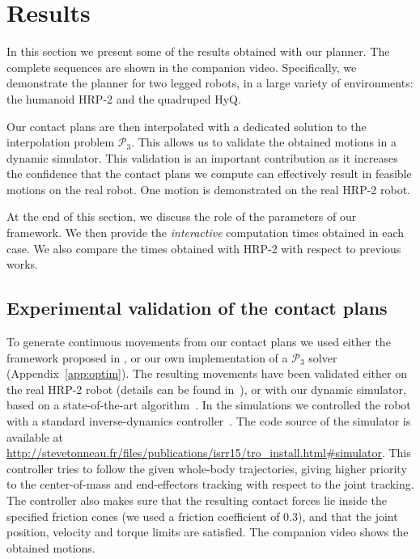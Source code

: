 \section{Results}
\label{sec:results}
In this section we present some of the results obtained with our planner. The complete sequences are shown in the companion video.
Specifically, we demonstrate the planner for two legged robots, in a large variety of environments: the humanoid HRP-2 and the quadruped HyQ.

Our contact plans are then interpolated with a dedicated solution to the interpolation problem $\mathcal{P}_3$. This allows us to validate the obtained
motions in a dynamic simulator. This validation is an important contribution as it increases the confidence that the contact plans we compute can effectively
result in feasible motions on the real robot. One motion is demonstrated on the real HRP-2 robot.

At the end of this section, we discuss the role of the parameters of our framework. We then provide the \textit{interactive} computation times obtained in each case.
We also compare the times obtained with HRP-2 with respect to previous works.

\subsection{Experimental validation of the contact plans} \label{sec:valid}
To generate continuous movements from our contact plans we used either the framework proposed in \cite{Carpentier2016}, or our own implementation of a $\mathcal{P}_3$ solver (Appendix~\ref{app:optim}).
The resulting movements have been validated either on the real HRP-2 robot (details can be found in~\cite{Carpentier2016}), or with our dynamic simulator, based on a state-of-the-art algorithm~\cite{Kaufman2008}.
In the simulations we controlled the robot with a standard inverse-dynamics controller~\cite{DelPrete2015b}. The code source of the simulator is available at \url{http://stevetonneau.fr/files/publications/isrr15/tro_install.html\#simulator}.
This controller tries to follow the given whole-body trajectories, giving higher priority to the center-of-mass and end-effectors tracking with respect to the joint tracking.
The controller also makes sure that the resulting contact forces lie inside the specified friction cones (we used a friction coefficient of 0.3), and that the joint position, velocity and torque limits are satisfied.
The companion video shows the obtained motions.

